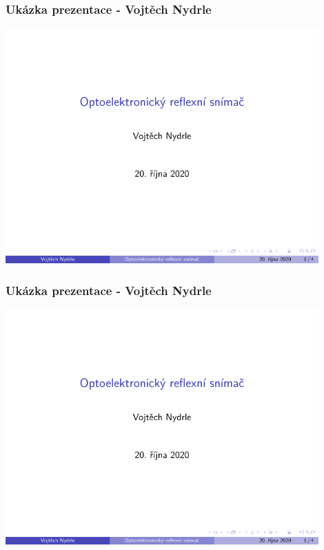 \documentclass{beamer}
\begin{document}
	\begin{frame}
    \frametitle{Ukázka prezentace - Vojtěch Nydrle}
		
		\includegraphics[page=1,width=0.9\textwidth]{pdf/prezentace_Vojtech_Nydrle.pdf}
	
	\end{frame}
	\begin{frame}
    \frametitle{Ukázka prezentace - Vojtěch Nydrle}
		
		\includegraphics[page=2,width=0.9\textwidth]{pdf/prezentace_Vojtech_Nydrle.pdf}
	
	\end{frame}
\end{document}
